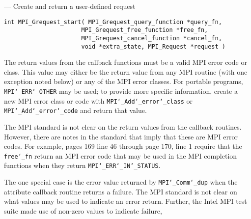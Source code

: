 \startmanpage
{}
--- Create and return a user-defined request 
\startvb\begin{verbatim}
int MPI_Grequest_start( MPI_Grequest_query_function *query_fn, 
                      MPI_Grequest_free_function *free_fn, 
                      MPI_Grequest_cancel_function *cancel_fn, 
                      void *extra_state, MPI_Request *request )

\end{verbatim}
\endvb

\par
{}
\par
{}
The return values from the callback functions must be a valid MPI error code
or class.  This value may either be the return value from any MPI routine
(with one exception noted below) or any of the MPI error classes.
For portable programs, {\tt MPI{\tt \char`\_}ERR{\tt \char`\_}OTHER} may be used; to provide more
specific information, create a new MPI error class or code with
{\tt MPI{\tt \char`\_}Add{\tt \char`\_}error{\tt \char`\_}class} or {\tt MPI{\tt \char`\_}Add{\tt \char`\_}error{\tt \char`\_}code} and return that value.
\par
The MPI standard is not clear on the return values from the callback routines.
However, there are notes in the standard that imply that these are MPI error
codes.  For example, pages 169 line 46 through page 170, line 1 require that
the {\tt free{\tt \char`\_}fn} return an MPI error code that may be used in the MPI completion
functions when they return {\tt MPI{\tt \char`\_}ERR{\tt \char`\_}IN{\tt \char`\_}STATUS}.
\par
The one special case is the error value returned by {\tt MPI{\tt \char`\_}Comm{\tt \char`\_}dup} when
the attribute callback routine returns a failure.  The MPI standard is not
clear on what values may be used to indicate an error return.  Further,
the Intel MPI test suite made use of non-zero values to indicate failure,
